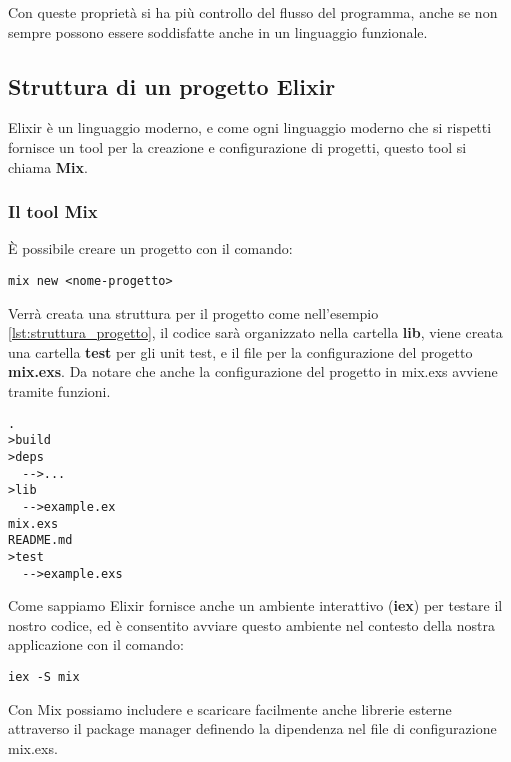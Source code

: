 Con queste proprietà si ha più controllo del flusso del programma,
anche se non sempre possono essere soddisfatte anche in un linguaggio
funzionale.


\subsection{Struttura di un progetto Elixir}

Elixir è un linguaggio moderno, e come ogni linguaggio moderno che
si rispetti fornisce un tool per la creazione e configurazione di
progetti, questo tool si chiama \textbf{Mix}.


\subsubsection{Il tool Mix}
È possibile creare un progetto con il comando:

\begin{lstlisting}[language=none]
mix new <nome-progetto>
\end{lstlisting}

Verrà creata una struttura per il progetto come nell'esempio \ref{lst:struttura_progetto},
il codice sarà organizzato nella cartella \textbf{lib}, viene creata una
cartella \textbf{test} per gli unit test, e il file per
la configurazione del progetto \textbf{mix.exs}.
Da notare che anche la configurazione del progetto in mix.exs
avviene tramite funzioni.

\begin{lstlisting}[language=none,captionpos=b,caption={Struttura progetto},label={lst:struttura_progetto}]
.
>build
>deps
  -->...
>lib
  -->example.ex
mix.exs
README.md
>test
  -->example.exs
\end{lstlisting}

Come sappiamo Elixir fornisce anche un ambiente interattivo (\textbf{iex}) per
testare il nostro codice, ed è consentito avviare questo ambiente nel
contesto della nostra applicazione con il comando:

\begin{lstlisting}[language=none]
iex -S mix 
\end{lstlisting}


Con Mix possiamo includere e scaricare facilmente
anche librerie esterne attraverso
il package manager definendo la dipendenza nel file di configurazione
mix.exs.\cite{HexDocs99:online}

